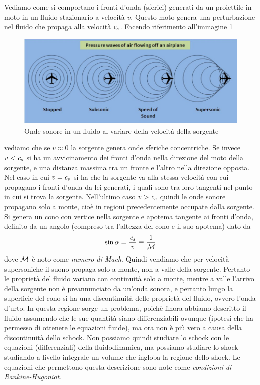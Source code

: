 Vediamo come si comportano i fronti d'onda (sferici) generati da un proiettile in moto in un fluido stazionario a velocità $v$. Questo moto genera una perturbazione nel fluido che propaga alla velocità $\textit{c}_{s}$. Facendo riferimento all'immagine \ref{im:Supersonic}
\begin{figure}[h!]
\includegraphics[width=\textwidth]{img/supersonic}
\caption{Onde sonore in un fluido al variare della velocità della sorgente} \label{im:Supersonic}
\end{figure}
vediamo che se $v \approx 0$ la sorgente genera onde sferiche concentriche. Se invece $v < \textit{c}_{s}$ si ha un avvicinamento dei fronti d'onda nella direzione del moto della sorgente, e una distanza massima tra un fronte e l'altro nella direzione opposta. Nel caso in cui $v = \textit{c}_{s}$ si ha che la sorgente va alla stessa velocità con cui propagano i fronti d'onda da lei generati, i quali sono tra loro tangenti nel punto in cui si trova la sorgente. Nell'ultimo caso $v >\textit{c}_{s}$ quindi le onde sonore propagano solo a monte, cioè in regioni precedentemente occupate dalla sorgente. Si genera un cono con vertice nella sorgente e apotema tangente ai fronti d'onda, definito da un angolo (compreso tra l'altezza del cono e il suo apotema) dato da
\begin{equation}
\sin \alpha = \dfrac{\textit{c}_{s}}{v} \equiv \dfrac{1}{\mathcal{M}}
\end{equation}
dove $\mathcal{M}$ è noto come \textit{numero di Mach}.
Quindi vendiamo che per velocità supersoniche il suono propaga solo a monte, non a valle della sorgente. Pertanto le proprietà del fluido variano con continuità solo a monte, mentre a valle l'arrivo della sorgente non è preannunciato da un'onda sonora, e pertanto lungo la superficie del cono si ha una discontinuità delle proprietà del fluido, ovvero l'onda d'urto. In questa regione sorge un problema, poichè finora abbiamo descritto il fluido assumendo che le sue quantità siano differenziabili ovunque (ipotesi che ha permesso di ottenere le equazioni fluide), ma ora non è più vero a causa della discontinuità dello schock. Non possiamo quindi studiare lo schock con le equazioni (differenziali) della fluidodinamica, ma possiamo studiare lo shock studiando a livello integrale un volume che ingloba la regione dello shock. Le equazioni che permettono questa descrizione sono note come \textit{condizioni di Rankine-Hugoniot}.

